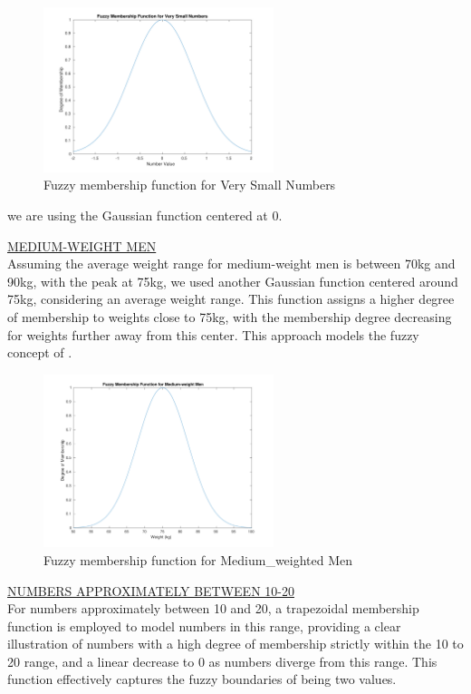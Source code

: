 \begin{figure}[H]
	\centering
	\includegraphics[width=0.6\textwidth]{../Problem 7/small_int.pdf}
	\caption{Fuzzy membership function for Very Small Numbers}	
\end{figure}
we are using the Gaussian function centered at 0.
\vspace{5mm}

\underline{MEDIUM-WEIGHT MEN}\\
Assuming the average weight range for medium-weight men is between 70kg and 90kg, with the peak at 75kg, we used another Gaussian function centered around 75kg, considering an average weight range. This function assigns a higher degree of membership to weights close to 75kg, with the membership degree decreasing for weights further away from this center. This approach models the fuzzy concept of .

\begin{figure}[H]
	\centering
	\includegraphics[width=0.6\textwidth]{../Problem 7/medium_weight.pdf}
	\caption{Fuzzy membership function for Medium\_weighted Men}	
\end{figure}
\vspace{5mm}

\underline{NUMBERS APPROXIMATELY BETWEEN 10-20}\\
For numbers approximately between 10 and 20, a trapezoidal membership function is employed to model numbers in this range, providing a clear illustration of numbers with a high degree of membership strictly within the 10 to 20 range, and a linear decrease to 0 as numbers diverge from this range. This function effectively captures the fuzzy boundaries of being  two values.

